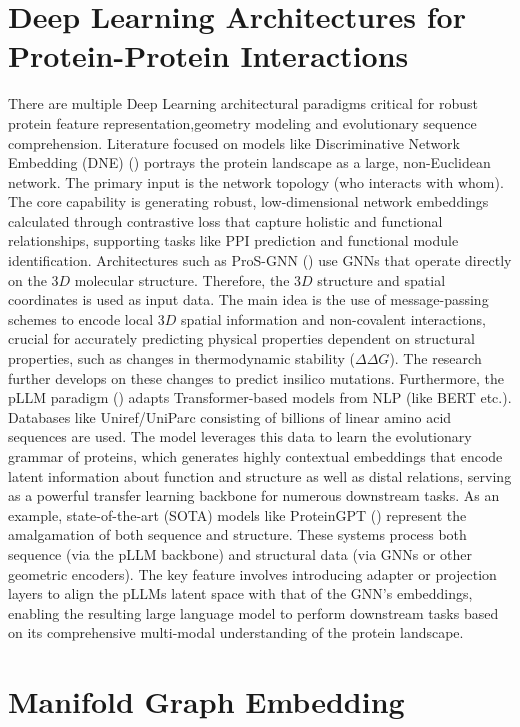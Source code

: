 \documentclass[twoside,11pt]{article}
\begin{document}
\section{Deep Learning Architectures for Protein-Protein Interactions}
There are multiple Deep Learning architectural paradigms critical for robust protein feature representation,geometry modeling and evolutionary sequence comprehension. Literature focused on models like Discriminative Network Embedding (DNE) (\citet{yan_etal_2024}) portrays the protein landscape as a large, non-Euclidean network. The primary input is the network topology (who interacts with whom). The core capability is generating robust, low-dimensional network embeddings calculated through contrastive loss that capture holistic and functional relationships, supporting tasks like PPI prediction and functional module identification. Architectures such as ProS-GNN (\citet{wang_etal_2023}) use GNNs that operate directly on the $3D$ molecular structure. Therefore, the $3D$ structure and spatial coordinates is used as input data. The main idea is the use of message-passing schemes to encode local $3D$ spatial information and non-covalent interactions, crucial for accurately predicting physical properties dependent on structural properties, such as changes in thermodynamic stability ($\Delta \Delta G$). The research further develops on these changes to predict insilico mutations. Furthermore, the pLLM paradigm (\citet{xiao_etal_2025}) adapts Transformer-based models from NLP (like BERT etc.). Databases like Uniref/UniParc consisting of billions of linear amino acid sequences are used. The model leverages this data to learn the evolutionary grammar of proteins, which generates highly contextual embeddings that encode latent information about function and structure as well as distal relations, serving as a powerful transfer learning backbone for numerous downstream tasks. As an example, state-of-the-art (SOTA) models like ProteinGPT (\citet{sun_etal_2025}) represent the amalgamation of both sequence and structure. These systems process both sequence (via the pLLM backbone) and structural data (via GNNs or other geometric encoders). The key feature involves introducing adapter or projection layers to align the pLLMs latent space with that of the GNN's embeddings, enabling the resulting large language model to perform downstream tasks based on its comprehensive multi-modal understanding of the protein landscape.
\label{sec:architecture}


\section{Manifold Graph Embedding} \label{sec:manifold}
\end{document}
